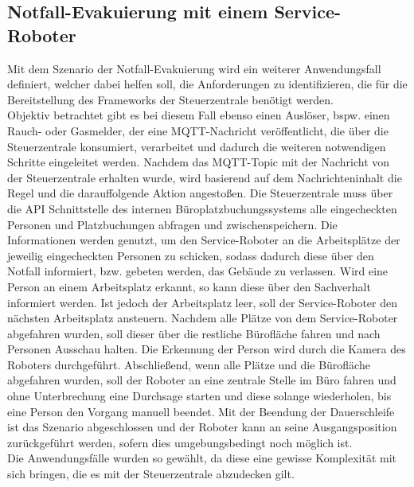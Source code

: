 \subsection{Notfall-Evakuierung mit einem Service-Roboter}
\label{subsec:evacuation}
    Mit dem Szenario der Notfall-Evakuierung wird ein weiterer Anwendungsfall definiert, welcher dabei helfen soll, die 
    Anforderungen zu identifizieren, die für die Bereitstellung des Frameworks der Steuerzentrale benötigt werden.
    \\
    \linebreak
    Objektiv betrachtet gibt es bei diesem Fall ebenso einen Auslöser, bspw. einen Rauch- 
    oder Gasmelder, der eine \acs{MQTT}-Nachricht veröffentlicht, die über die Steuerzentrale konsumiert, verarbeitet und dadurch die 
    weiteren notwendigen Schritte eingeleitet werden. Nachdem das \acs{MQTT}-Topic mit der Nachricht von der Steuerzentrale erhalten wurde, wird 
    basierend auf dem Nachrichteninhalt die Regel und die darauffolgende Aktion angestoßen. Die Steuerzentrale muss über die \acs{API} 
    Schnittstelle des internen Büroplatzbuchungssystems alle eingecheckten Personen und Platzbuchungen abfragen und 
    zwischenspeichern. Die Informationen werden genutzt, um den Service-Roboter an die Arbeitsplätze der jeweilig 
    eingecheckten Personen zu schicken, sodass dadurch diese über den Notfall informiert, bzw. gebeten werden, das 
    Gebäude zu verlassen. Wird eine Person an einem Arbeitsplatz erkannt, so kann diese über den Sachverhalt informiert 
    werden. Ist jedoch der Arbeitsplatz leer, soll der Service-Roboter den nächsten Arbeitsplatz ansteuern. Nachdem alle 
    Plätze von dem Service-Roboter abgefahren wurden, soll dieser über die restliche Bürofläche fahren und nach Personen 
    Ausschau halten. Die Erkennung der Person wird durch die Kamera des Roboters durchgeführt. Abschließend, wenn alle Plätze und die 
    Bürofläche abgefahren wurden, soll der Roboter an eine zentrale Stelle im Büro fahren und ohne Unterbrechung eine 
    Durchsage starten und diese solange wiederholen, bis eine Person den Vorgang manuell beendet. Mit der Beendung der Dauerschleife 
    ist das Szenario abgeschlossen und der Roboter kann an seine Ausgangsposition zurückgeführt werden, sofern dies 
    umgebungsbedingt noch möglich ist.
    \\
    \linebreak
    Die Anwendungsfälle wurden so gewählt, da diese eine gewisse Komplexität mit sich bringen, die es mit der Steuerzentrale 
    abzudecken gilt.
    \\
